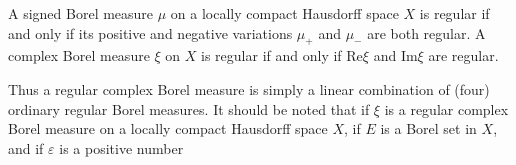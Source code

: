 A signed Borel measure $\mu$ on a locally compact Hausdorff space $X$ is regular if and only if its positive and negative variations $\mu_+$ and $\mu_-$ are both regular. A complex Borel measure $\xi$ on $X$ is regular if and only if $\text{Re} \xi$ and $\text{Im} \xi$ are regular.

Thus a regular complex Borel measure is simply a linear combination of (four) ordinary regular Borel measures. It should be noted that if $\xi$ is a regular complex Borel measure on a locally compact Hausdorff space $X$, if $E$ is a Borel set in $X$, and if $\varepsilon$ is a positive number
